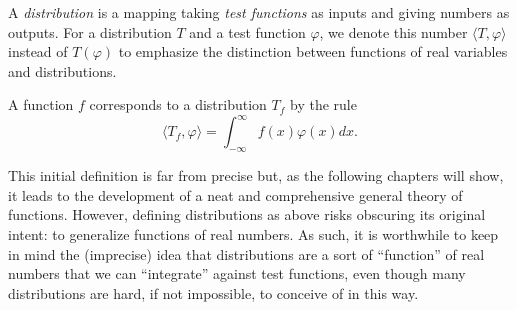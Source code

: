   \begin{defn}[Distribution]
    A \emph{distribution} is a mapping taking \emph{test functions} as inputs and giving numbers as outputs.
    For a distribution $T$ and a test function $\varphi$, we denote this number $\langle T, \varphi \rangle$ instead of $T(\varphi)$ to emphasize the distinction between functions of real variables and distributions.

    A function $f$ corresponds to a distribution $T_f$ by the rule
    \begin{equation*}
      \langle T_f, \varphi \rangle = \int_{-\infty}^{\infty} f(x)\varphi(x)dx \text{.}
    \end{equation*}

  \end{defn}

  This initial definition is far from precise but, as the following chapters will show, it leads to the development of a neat and comprehensive general theory of functions.
  However, defining distributions as above risks obscuring its original intent: to generalize functions of real numbers.
  As such, it is worthwhile to keep in mind the (imprecise) idea that distributions are a sort of ``function'' of real numbers that we can ``integrate'' against test functions, even though many distributions are hard, if not impossible, to conceive of in this way.



